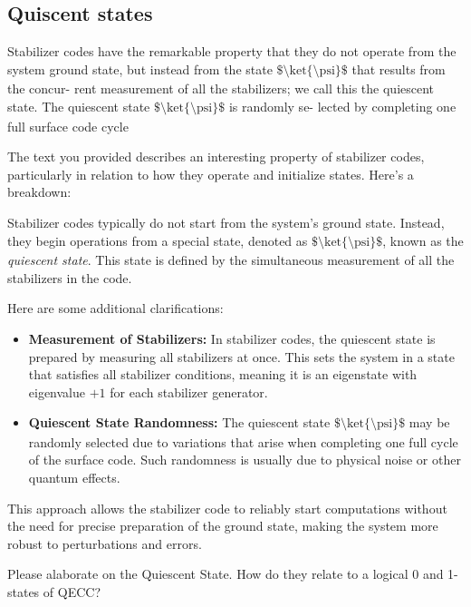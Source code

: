 \subsection{Quiscent states}


\begin{ai}
Stabilizer codes have the remarkable property that
they do not operate from the system ground state, but
instead from the state $\ket{\psi}$ that results from the concur-
rent measurement of all the stabilizers; we call this the
quiescent state. The quiescent state $\ket{\psi}$ is randomly se-
lected by completing one full surface code cycle
\end{ai}

\begin{airesult}
The text you provided describes an interesting property of stabilizer codes, particularly in
relation to how they operate and initialize states. Here's a breakdown:

\vsp

Stabilizer codes typically do not start from the system's ground state. Instead, they begin
operations from a special state, denoted as \(\ket{\psi}\), known as the \textit{quiescent state}.
This state is defined by the simultaneous measurement of all the stabilizers in the code.

\vsp

Here are some additional clarifications:

\begin{itemize}
  \item \textbf{Measurement of Stabilizers:} In stabilizer codes, the quiescent state is prepared by
measuring all stabilizers at once. This sets the system in a state that satisfies all stabilizer
conditions, meaning it is an eigenstate with eigenvalue \(+1\) for each stabilizer generator.
  \item \textbf{Quiescent State Randomness:} The quiescent state \(\ket{\psi}\) may be randomly
selected due to variations that arise when completing one full cycle of the surface code. Such
randomness is usually due to physical noise or other quantum effects.
\end{itemize}

\vsp

This approach allows the stabilizer code to reliably start computations without the need for precise
preparation of the ground state, making the system more robust to perturbations and errors.
\end{airesult}

\begin{ai}
Please alaborate on the Quiescent State. How do they relate to a logical 0 and 1- states of QECC?
\end{ai}

